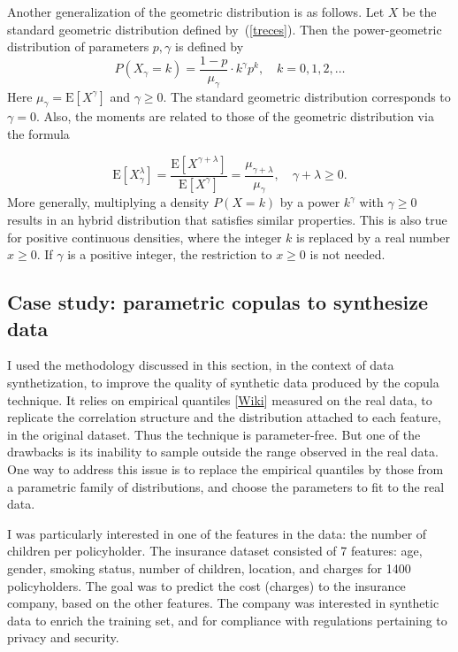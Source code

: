 \documentclass[oneside,10pt]{book}
\begin{document}
Another generalization of the geometric distribution is as follows. Let $X$ be the standard geometric distribution defined by~(\ref{treces}). Then the \textcolor{index}{power-geometric distribution} of parameters $p,\gamma$ is defined by  
$$P(X_\gamma=k) = \frac{1-p}{\mu_\gamma}\cdot k^\gamma p^k, \quad k=0,1,2,\dots$$ 
Here $\mu_\gamma = \text{E}[X^\gamma]$ and $\gamma\geq 0$. 
The standard
 geometric distribution corresponds to $\gamma=0$.
 Also, the moments are related to those of the geometric distribution via the formula

$$\text{E}[X_\gamma^\lambda] = \frac{\text{E}[X^{\gamma+\lambda}]}{\text{E}[X^\gamma]}=\frac{\mu_{\gamma+\lambda}}{\mu_{\gamma}}, \quad \gamma+\lambda \geq 0.$$ 
More generally, multiplying a density $P(X =k)$ by a power $k^\gamma$ with $\gamma\geq 0$ results in an hybrid distribution that satisfies similar properties. This is also true for positive continuous densities, where the integer $k$ is replaced by a real number $x\geq 0$.
If $\gamma$ is a positive integer, the restriction to $x\geq 0$ is not needed.


\subsection{Case study: parametric copulas to synthesize data}

I used the methodology discussed in this section, in the context of data synthetization, to improve the quality of  
\textcolor{index}{synthetic data} produced by the copula technique. It relies on \textcolor{index}{empirical quantiles} [\href{https://en.wikipedia.org/wiki/Quantile_function}{Wiki}] measured on the real data, to replicate the correlation structure and the distribution attached to each feature, in the original dataset. Thus the technique is parameter-free. But one of the drawbacks is its inability to sample outside
 the range observed in the real data. 
One way to address this issue is to replace the empirical quantiles by those from a parametric family of distributions, and choose the
 parameters to fit to the real data. 

I was particularly interested in one of the features in the data: the number of children per policyholder. The insurance dataset consisted of 7 features: age, gender, smoking status, number of children, location, and charges for 1400
 policyholders. The goal was to predict the cost (charges) to the insurance company, based on the other features. The company was interested in synthetic data to enrich the training set, and for compliance with regulations
 pertaining to privacy and security.
\end{document}
